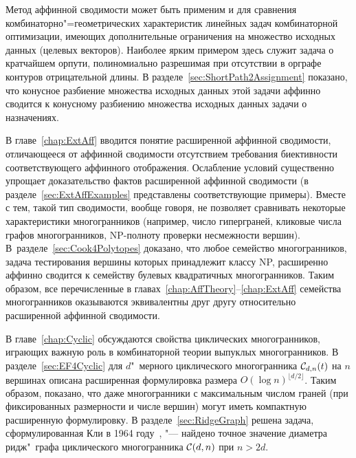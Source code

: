 Метод аффинной сводимости может быть применим и для сравнения комбинаторно"=геометрических характеристик линейных задач комбинаторной оптимизации, имеющих дополнительные ограничения на множество исходных данных (целевых векторов).
Наиболее ярким примером здесь служит задача о кратчайшем орпути, полиномиально разрешимая при отсутствии в орграфе контуров отрицательной длины. В разделе~\ref{sec:ShortPath2Assignment} показано, что конусное разбиение множества исходных данных этой задачи аффинно сводится к конусному разбиению множества исходных данных задачи о назначениях.

В главе~\ref{chap:ExtAff} вводится понятие расширенной аффинной сводимости, отличающееся от аффинной сводимости отсутствием требования биективности соответствующего аффинного отображения. Ослабление условий существенно упрощает доказательство фактов расширенной аффинной сводимости (в разделе~\ref{sec:ExtAffExamples} представлены соответствующие примеры). Вместе с тем, такой тип сводимости, вообще говоря, не позволяет сравнивать некоторые характеристики многогранников (например, число гиперграней, кликовые числа графов многогранников, NP-полноту проверки несмежности вершин). В~разделе~\ref{sec:Cook4Polytopes} доказано, что любое семейство многогранников, задача тестирования вершины которых принадлежит классу NP, расширенно аффинно сводится к семейству булевых квадратичных многогранников. Таким образом, все перечисленные в главах~\ref{chap:AffTheory}--\ref{chap:ExtAff} семейства многогранников оказываются эквивалентны друг другу относительно расширенной аффинной сводимости.

В главе~\ref{chap:Cyclic} обсуждаются свойства циклических многогранников, играющих важную роль в комбинаторной теории выпуклых многогранников. В разделе~\ref{sec:EF4Cyclic} для $d$"~мерного циклического многогранника ${\mathcal C}_{d,n}(t)$ на $n$ вершинах описана расширенная формулировка размера $O(\log n)^{\lfloor d/2 \rfloor}$. Таким образом, показано, что даже многогранники с максимальным числом граней (при фиксированных размерности и числе вершин) могут иметь компактную расширенную формулировку. В разделе~\ref{sec:RidgeGraph} решена задача, сформулированная Кли в 1964 году~\cite{Klee:1964}, "--- найдено точное значение диаметра ридж"~графа циклического многогранника ${\mathcal C}(d,n)$ при $n>2d$.

